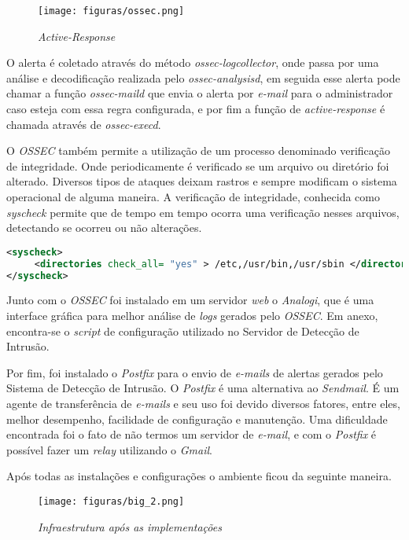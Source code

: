 \begin{figure}[!h]
\centering
\texttt{[image: figuras/ossec.png]}
\caption{\textit{Active-Response}} 	
\end{figure}

O alerta é coletado através do método \textit{ossec-logcollector}, onde passa por uma análise e decodificação realizada pelo \textit{ossec-analysisd}, em seguida esse alerta pode chamar a função \textit{ossec-maild} que envia o alerta por \textit{e-mail} para o administrador caso esteja com essa regra configurada, e por fim a função de \textit{active-response} é chamada através de \textit{ossec-execd}.

O \textit{OSSEC} também permite a utilização de um processo denominado verificação de integridade. Onde periodicamente é verificado se um arquivo ou diretório foi alterado. Diversos tipos de ataques deixam rastros e sempre modificam o sistema operacional de alguma maneira. A verificação de integridade, conhecida como \textit{syscheck} permite que de tempo em tempo ocorra uma verificação nesses arquivos, detectando se ocorreu ou não alterações.

\begin{lstlisting}[language=XML]
<syscheck>
     <directories check_all= "yes" > /etc,/usr/bin,/usr/sbin </directories>
</syscheck>
\end{lstlisting}

Junto com o \textit{OSSEC} foi instalado em um servidor \textit{web} o \textit{Analogi}, que é uma interface gráfica para melhor análise de \textit{logs} gerados pelo \textit{OSSEC}. Em anexo, encontra-se o \textit{script} de configuração utilizado no Servidor de Detecção de Intrusão.

Por fim, foi instalado o \textit{Postfix} para o envio de \textit{e-mails} de alertas gerados pelo Sistema de Detecção de Intrusão. O \textit{Postfix} é uma alternativa ao \textit{Sendmail}. É um agente de transferência de \textit{e-mails} e seu uso foi devido diversos fatores, entre eles, melhor desempenho, facilidade de configuração e manutenção. Uma dificuldade encontrada foi o fato de não termos um servidor de \textit{e-mail}, e com o \textit{Postfix} é possível fazer um \textit{relay} utilizando o \textit{Gmail}.

Após todas as instalações e configurações o ambiente ficou da seguinte maneira.

\begin{figure}[!h]
\centering
\texttt{[image: figuras/big\_2.png]}
\caption{\textit{Infraestrutura após as implementações}} 	
\end{figure}




